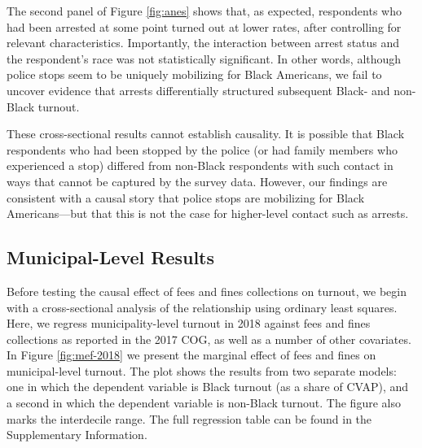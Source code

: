 \documentclass[
  12pt,
]{article}
\begin{document}
The second panel of Figure \ref{fig:anes} shows that, as expected, respondents who had been arrested at some point turned out at lower rates, after controlling for relevant characteristics. Importantly, the interaction between arrest status and the respondent's race was not statistically significant. In other words, although police stops seem to be uniquely mobilizing for Black Americans, we fail to uncover evidence that arrests differentially structured subsequent Black- and non-Black turnout.

These cross-sectional results cannot establish causality. It is possible that Black respondents who had been stopped by the police (or had family members who experienced a stop) differed from non-Black respondents with such contact in ways that cannot be captured by the survey data. However, our findings are consistent with a causal story that police stops are mobilizing for Black Americans---but that this is not the case for higher-level contact such as arrests.

\hypertarget{municipal-level-results}{%
\subsection*{Municipal-Level Results}\label{municipal-level-results}}

Before testing the causal effect of fees and fines collections on turnout, we begin with a cross-sectional analysis of the relationship using ordinary least squares. Here, we regress municipality-level turnout in 2018 against fees and fines collections as reported in the 2017 COG, as well as a number of other covariates. In Figure \ref{fig:mef-2018} we present the marginal effect of fees and fines on municipal-level turnout. The plot shows the results from two separate models: one in which the dependent variable is Black turnout (as a share of CVAP), and a second in which the dependent variable is non-Black turnout. The figure also marks the interdecile range. The full regression table can be found in the Supplementary Information.
\end{document}

